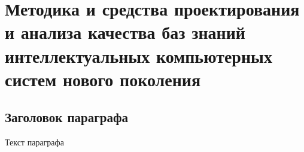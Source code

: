 \chapter{Методика и средства проектирования и анализа качества баз знаний интеллектуальных компьютерных систем нового поколения}
\label{chapter_kb_design}


\section{Заголовок параграфа}
Текст параграфа

%